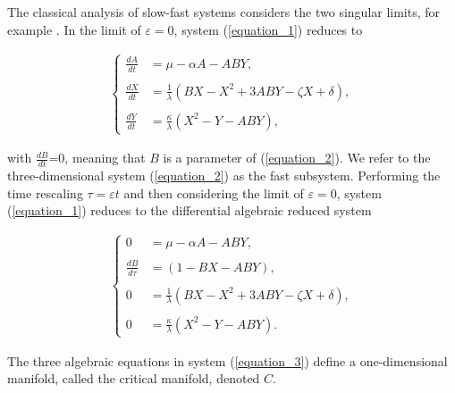 \documentclass{ws-ijbc}
\begin{document}
The classical analysis of slow-fast systems considers the two singular limits, for example \cite{MMO}.  In the limit of $\varepsilon = 0$, system (\ref{equation_1}) reduces to
    
\begin{equation}
\begin{aligned}
\begin{cases}
\frac{dA}{dt} &= \mu - \alpha A - ABY, \\ \\
\frac{dX}{dt} &= \frac{1}{\lambda}(BX - X^2 +3ABY - \zeta X + \delta), \\ \\
\frac{dY}{dt} &= \frac{\kappa}{\lambda}(X^2 - Y - ABY),
\end{cases}
\end{aligned}
\label{equation_2}
\end{equation}
    
\noindent
with $\frac{dB}{dt}$=0, meaning that $B$ is a parameter of (\ref{equation_2}).  We refer to the three-dimensional system (\ref{equation_2}) as the fast subsystem.  Performing the time rescaling $\tau = \varepsilon t$ and then considering the limit of $\varepsilon = 0$, system (\ref{equation_1}) reduces to the differential algebraic reduced system
    
 \begin{equation}
\begin{aligned}
\begin{cases}
0 &= \mu - \alpha A - ABY, \\ \\
\frac{dB}{d\tau} &= (1-BX - ABY), \\ \\
0 &= \frac{1}{\lambda}(BX - X^2 +3ABY - \zeta X + \delta), \\ \\
0 &= \frac{\kappa}{\lambda}(X^2 - Y - ABY).
\end{cases}
\end{aligned}
\label{equation_3}
\end{equation}
    
\noindent
The three algebraic equations in system (\ref{equation_3}) define a one-dimensional manifold, called the critical manifold, denoted $C$.
\end{document}
